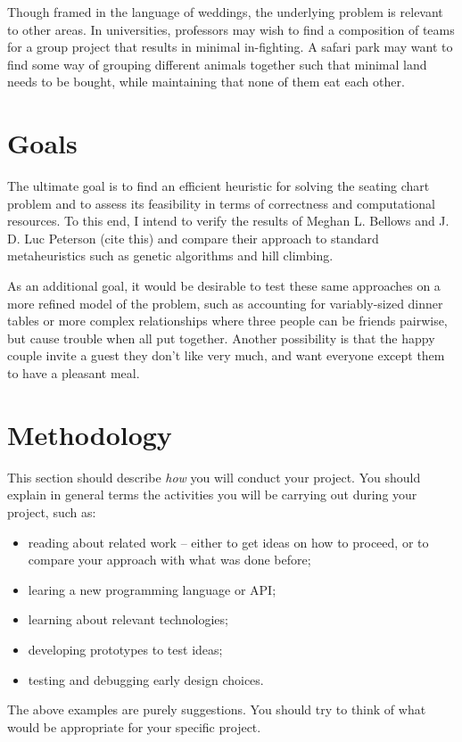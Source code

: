 \documentclass[a4paper,12pt]{article}
\begin{document}
Though framed in the language of weddings, the underlying problem
is relevant to other areas. In universities, professors may wish
to find a composition of teams for a group project that results in
minimal in-fighting. A safari park may want to find some way of
grouping different animals together such that minimal land needs
to be bought, while maintaining that none of them eat each other.

\section*{Goals}

\iffalse
This section should describe the the main goals of your project.
In other words, describe {\em what} it is that you want to do.
Are you building a tool or an application? What functionality 
already exists, and what will you have to do yourself?

Try to make it clear which goals are central to your project, and which
might be optional extras. Try to be realistic about making your
goals {\em achievable.}
\fi

The ultimate goal is to find an efficient heuristic for solving the seating
chart problem and to assess its feasibility in terms of correctness and
computational resources. To this end, I intend to verify the results of Meghan
L. Bellows and J. D. Luc Peterson (cite this) and compare their approach to
standard metaheuristics such as genetic algorithms and hill climbing.

As an additional goal, it would be desirable to test these same approaches on a
more refined model of the problem, such as accounting for  variably-sized dinner
tables or more complex relationships where three people can be friends pairwise,
but cause trouble when all put together. Another possibility is that the happy
couple invite a guest they don't like very much, and want everyone except them to
have a pleasant meal.


\section*{Methodology}

This section should describe {\em how} you will conduct
your project. You should explain in general terms
the activities you will be carrying out during your project, such as:
%
\begin{itemize}
\item reading about related work -- either to get ideas on how to
      proceed, or to compare your approach with what was done before;
\item learing a new programming language or API;
\item learning about relevant technologies;
\item developing prototypes to test ideas;
\item testing and debugging early design choices.
\end{itemize}
%
The above examples are purely suggestions. You should try to think
of what would be appropriate for your specific project.
\end{document}
